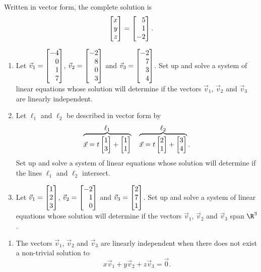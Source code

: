 \begin{exercises}
\begin{problist}
\begin{solution}
\begin{enumerate}
				Written in vector form, the complete solution is
				\[
				\mat{x\\y\\z} = \mat{5\\1\\-2}.
				\]
			\end{enumerate}
		\end{solution}
		\prob 
		\begin{enumerate}
			\item Let $\vec v_1=\mat{-4\\0\\1\\7}$, $\vec v_2=\mat{-2\\8\\0\\3}$ and $\vec v_3=\mat{-2\\7\\3\\4}$. Set up and solve a system of linear equations whose solution will determine if the vectors $\vec v_1$, $\vec v_2$ and $\vec v_3$ are linearly independent.
			\item Let $\ell_1$ and $\ell_2$ be described in vector form by
			\[
			\overbrace{\vec x=t\mat{1\\3}+\mat{1\\1}}^{\displaystyle \ell_1}
			\quad
			\overbrace{\vec x=t\mat{2\\1}+\mat{3\\4}}^{\displaystyle \ell_2}.
			\]
			Set up and solve a system of linear equations whose solution will determine if the lines $\ell_1$ and $\ell_2$ intersect.
			\item Let $\vec v_1=\mat{1\\2\\3}$, $\vec v_2=\mat{-2\\1\\0}$ and $\vec v_3=\mat{2\\7\\1}$. Set up and solve a system of linear equations whose solution will determine if the vectors $\vec v_1$, $\vec v_2$ and $\vec v_3$ span $\R^3$.
		\end{enumerate}
		\begin{solution}
			\begin{enumerate}
				\item The vectors $\vec v_1$, $\vec v_2$ and $\vec v_3$ are linearly independent when there does not exist a non-trivial solution to
				\[
					x\vec v_1+y\vec v_2+z\vec v_3=\vec 0.
				\]
				

\end{enumerate}
\end{solution}
\end{problist}
\end{exercises}
